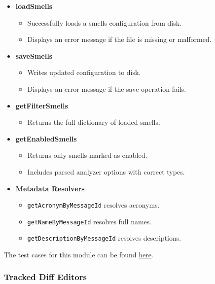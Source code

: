 \documentclass[12pt, titlepage]{article}
\begin{document}
\begin{itemize}
  \item \textbf{loadSmells}
    \begin{itemize}
      \item Successfully loads a smells configuration from disk.
      \item Displays an error message if the file is missing or malformed.
    \end{itemize}

  \item \textbf{saveSmells}
    \begin{itemize}
      \item Writes updated configuration to disk.
      \item Displays an error message if the save operation fails.
    \end{itemize}

  \item \textbf{getFilterSmells}
    \begin{itemize}
      \item Returns the full dictionary of loaded smells.
    \end{itemize}

  \item \textbf{getEnabledSmells}
    \begin{itemize}
      \item Returns only smells marked as enabled.
      \item Includes parsed analyzer options with correct types.
    \end{itemize}

  \item \textbf{Metadata Resolvers}
    \begin{itemize}
      \item \texttt{getAcronymByMessageId} resolves acronyms.
      \item \texttt{getNameByMessageId} resolves full names.
      \item \texttt{getDescriptionByMessageId} resolves descriptions.
    \end{itemize}
\end{itemize}

\noindent The test cases for this module can be found
\href{https://github.com/ssm-lab/capstone--sco-vs-code-plugin/blob/plugin-multi-file/test/utils/smellsData.test.ts}{here}.

\subsubsection{Tracked Diff Editors}
\end{document}

